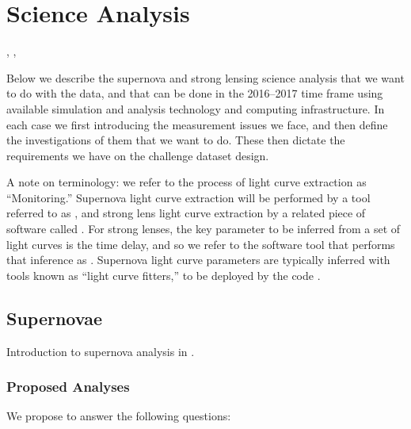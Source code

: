 \section{Science Analysis}
\label{sec:twinkles1:science}

,
,

Below we describe the supernova and strong lensing science analysis
that we want to do with the \TwinklesOne data, and that can be done
in the 2016--2017 time frame using available simulation and analysis
technology and computing infrastructure. In each case we first
introducing the measurement issues we face, and then define the
investigations of them that we want to do. These then dictate the
requirements we have on the challenge dataset design.

A note on terminology: we refer to the process of light curve
extraction as ``Monitoring.'' Supernova light curve extraction will be
performed by a  tool referred to as \SNMonitor, and strong lens light
curve extraction  by a related piece of software called \SLMonitor.
For strong lenses, the key parameter to be inferred  from a set of
light curves is the time delay, and so we refer to the software tool
that  performs that inference as \SLTimer. Supernova light curve
parameters  are typically inferred with tools known as
``light curve fitters,'' to be deployed by the code \SNDistance.



\subsection{Supernovae}
\label{sec:twinkles1:science:supernovae}

Introduction to supernova analysis in \TwinklesOne.


\subsubsection{Proposed Analyses}
\label{sec:twinkles1:science:supernovae:analyses}

We propose to answer the following questions:

